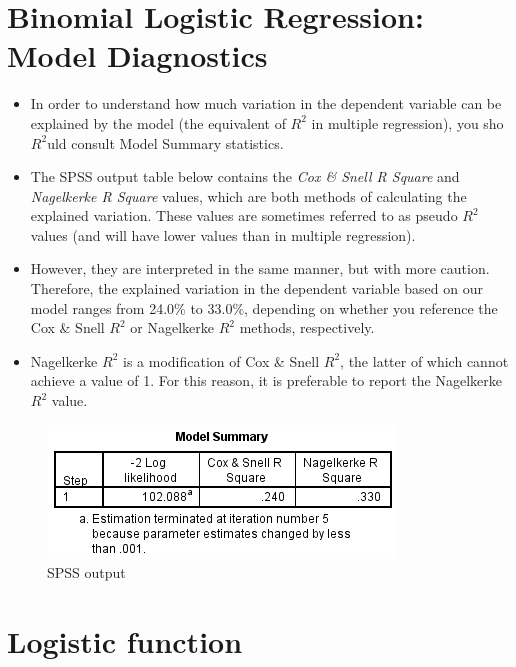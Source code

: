 \documentclass[a4paper,12pt]{article}
\begin{document}
\section{Binomial Logistic Regression: Model Diagnostics}

\begin{itemize}
	\item In order to understand how much variation in the dependent variable can be explained by the model (the equivalent of $R^2$ in multiple regression), you sho$R^2$uld consult Model Summary statistics.
	
	\item The SPSS output table below contains the \textit{Cox \& Snell R Square} and \textit{Nagelkerke R Square }values, which are both methods of calculating the explained variation. These values are sometimes referred to as pseudo $R^2$ values (and will have lower values than in multiple regression).
	\item  However, they are interpreted in the same manner, but with more caution. Therefore, the explained variation in the dependent variable based on our model ranges from 24.0\% to 33.0\%, depending on whether you reference the Cox \& Snell $R^2$ or Nagelkerke $R^2$ methods, respectively. 
	
	\item Nagelkerke $R^2$ is a modification of Cox \& Snell $R^2$, the latter of which cannot achieve a value of 1. For this reason, it is preferable to report the Nagelkerke $R^2$ value.
\end{itemize}

\begin{figure}[h!]
\centering
\includegraphics[width=0.9\linewidth]{images/BLogReg-Rsq}
\caption{SPSS output}
\label{fig:BLogReg-Rsq}
\end{figure}



\section*{Logistic function} 
\end{document}
